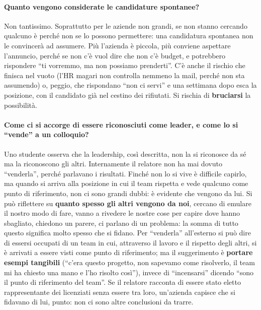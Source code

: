 \paragraph{Quanto vengono considerate le candidature spontanee?} Non tantissimo. Soprattutto per le aziende non grandi,
se non stanno cercando qualcuno è perché non se lo possono permettere: una candidatura spontanea non le convincerà ad
assumere. Più l'azienda è piccola, più conviene aspettare l'annuncio, perché se non c'è vuol dire che non c'è budget, e
potrebbero rispondere ``ti vorremmo, ma non possiamo prenderti''. C'è anche il rischio che finisca nel vuoto (l'HR magari
non controlla nemmeno la mail, perché non sta assumendo) o, peggio, che rispondano ``non ci servi'' e una settimana dopo
esca la posizione, con il candidato già nel cestino dei rifiutati. Si rischia di \textbf{bruciarsi} la possibilità.

\paragraph{Come ci si accorge di essere riconosciuti come leader, e come lo si ``vende'' a un colloquio?} Uno studente
osserva che la leadership, così descritta, non la si riconosce da sé ma la riconoscono gli altri. Internamente il
relatore non ha mai dovuto ``venderla'', perché parlavano i risultati. Finché non lo si vive è difficile capirlo, ma
quando si arriva alla posizione in cui il team rispetta e vede qualcuno come punto di riferimento, non ci sono grandi
dubbi: è evidente che vengono da lui. Si può riflettere su \textbf{quanto spesso gli altri vengono da noi}, cercano di
emulare il nostro modo di fare, vanno a rivedere le nostre cose per capire dove hanno sbagliato, chiedono un parere, ci
parlano di un problema: la somma di tutto questo significa molto spesso che si fidano. Per ``venderla'' all'esterno si
può dire di essersi occupati di un team in cui, attraverso il lavoro e il rispetto degli altri, si è arrivati a essere
visti come punto di riferimento; ma il suggerimento è \textbf{portare esempi tangibili} (``c'era questo progetto, non
sapevamo come risolverlo, il team mi ha chiesto una mano e l'ho risolto così''), invece di ``incensarsi'' dicendo ``sono
il punto di riferimento del team''. Se il relatore racconta di essere stato eletto rappresentante dei licenziati senza
essere tra loro, un'azienda capisce che si fidavano di lui, punto: non ci sono altre conclusioni da trarre.

